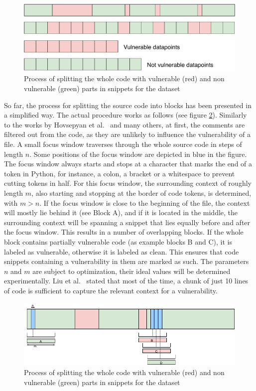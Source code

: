 \documentclass[
a4paper,
pagesize,
pdftex,
12pt,
twoside, %
BCOR=5mm, %
ngerman,
fleqn,
final,
]{scrartcl}
\begin{document}
	\begin{figure}[ht]
		\centering
		\includegraphics[width=0.8\linewidth]{img/collectData2}
		\caption{Process of splitting the whole code with vulnerable (red) and non vulnerable (green) parts in snippets for the dataset}
		\label{fig:collectData2}
	\end{figure}
	
	So far, the process for splitting the source code into blocks has been presented in a simplified way. The actual procedure works as follows (see figure \ref{fig:FocusBlocks}).
	Similarly to the works by Hovsepyan et al.~\cite{Hovsepyan.2012} and many others, at first, the comments are filtered out from the code, as they are unlikely to influence the vulnerability of a file. A small focus window traverses through the whole source code in steps of length $n$. Some positions of the focus window are depicted in blue in the figure. The focus window always starts and stops at a character that marks the end of a token in Python, for instance, a colon, a bracket or a whitespace to prevent cutting tokens in half. For this focus window, the surrounding context of roughly length $m$, also starting and stopping at the border of code tokens, is determined, with $m > n$. If the focus window is close to the beginning of the file, the context will mostly lie behind it (see Block A), and if it is located in the middle, the surrounding context will be spanning a snippet that lies equally before and after the focus window. This results in a number of overlapping blocks. If the whole block contains partially vulnerable code (as example blocks B and C), it is labeled as vulnerable, otherwise it is labeled as clean. This ensures that code snippets containing a vulnerability in them are marked as such. The parameters $n$ and $m$ are subject to optimization, their ideal values will be determined experimentally. Liu et al.~\cite{Liu.2018} stated that most of the time, a chunk of just 10 lines of code is sufficient to capture the relevant context for a vulnerability.
	
	\begin{figure}[ht]
		\centering
		\includegraphics[width=0.9\linewidth]{img/FocusBlocks}
		\caption{Process of splitting the whole code with vulnerable (red) and non vulnerable (green) parts in snippets for the dataset}
		\label{fig:FocusBlocks}
	\end{figure}
	
\end{document}
